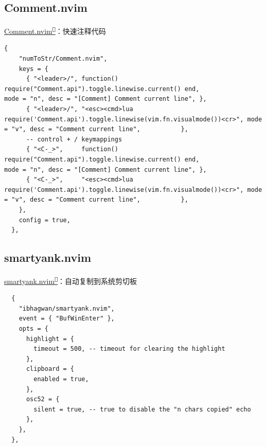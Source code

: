 \documentclass[aspectratio=169]{ctexbeamer}
\newcommand{\nerd}[1]{\texttt{#1}}
\newcommand{\link}[3][]{\href{#3}{#2\textsuperscript{\nerd{}}}}
\begin{document}
  \subsection{Comment.nvim}
    \begin{frame}[fragile]{\link{Comment.nvim}{https://github.com/numToStr/Comment.nvim}：快速注释代码}

      \begin{lstlisting}[basicstyle=\tiny\ttfamily]
  {
    "numToStr/Comment.nvim",
    keys = {
      { "<leader>/", function() require("Comment.api").toggle.linewise.current() end,                 mode = "n", desc = "[Comment] Comment current line", },
      { "<leader>/", "<esc><cmd>lua require('Comment.api').toggle.linewise(vim.fn.visualmode())<cr>", mode = "v", desc = "Comment current line",           },
      -- control + / keymappings
      { "<C-_>",     function() require("Comment.api").toggle.linewise.current() end,                 mode = "n", desc = "[Comment] Comment current line", },
      { "<C-_>",     "<esc><cmd>lua require('Comment.api').toggle.linewise(vim.fn.visualmode())<cr>", mode = "v", desc = "Comment current line",           },
    },
    config = true,
  },
      \end{lstlisting}
    \end{frame}

  \subsection{smartyank.nvim}
    \begin{frame}[fragile]{\link{smartyank.nvim}{https://github.com/ibhagwan/smartyank.nvim}：自动复制到系统剪切板}

      \begin{lstlisting}
  {
    "ibhagwan/smartyank.nvim",
    event = { "BufWinEnter" },
    opts = {
      highlight = {
        timeout = 500, -- timeout for clearing the highlight
      },
      clipboard = {
        enabled = true,
      },
      osc52 = {
        silent = true, -- true to disable the "n chars copied" echo
      },
    },
  },
      \end{lstlisting}
    \end{frame}
\end{document}
